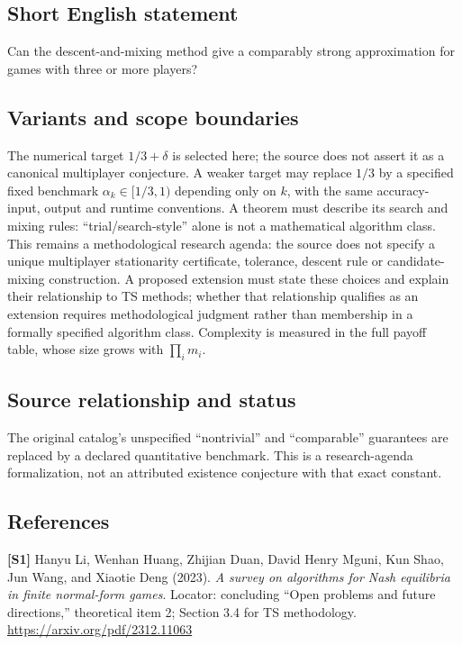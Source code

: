 \documentclass[11pt,a4paper]{article}
\begin{document}
\subsection*{Short English statement}
Can the descent-and-mixing method give a comparably strong approximation for games with three or more players?
\subsection*{Variants and scope boundaries}
The numerical target $1/3+\delta$ is selected here; the source does not assert it as a canonical multiplayer conjecture. A weaker target may replace $1/3$ by a specified fixed benchmark $\alpha_k\in[1/3,1)$ depending only on $k$, with the same accuracy-input, output and runtime conventions. A theorem must describe its search and mixing rules: ``trial/search-style'' alone is not a mathematical algorithm class. This remains a methodological research agenda: the source does not specify a unique multiplayer stationarity certificate, tolerance, descent rule or candidate-mixing construction. A proposed extension must state these choices and explain their relationship to TS methods; whether that relationship qualifies as an extension requires methodological judgment rather than membership in a formally specified algorithm class. Complexity is measured in the full payoff table, whose size grows with $\prod_i m_i$.
\subsection*{Source relationship and status}
The original catalog's unspecified ``nontrivial'' and ``comparable'' guarantees are replaced by a declared quantitative benchmark. This is a research-agenda formalization, not an attributed existence conjecture with that exact constant.
\subsection*{References}
\begingroup\footnotesize\raggedright
{\footnotesize\raggedright
\textbf{[S1]} Hanyu Li, Wenhan Huang, Zhijian Duan, David Henry Mguni, Kun Shao, Jun Wang, and Xiaotie Deng (2023). \emph{A survey on algorithms for Nash equilibria in finite normal-form games}. Locator: concluding ``Open problems and future directions,'' theoretical item 2; Section 3.4 for TS methodology. \url{https://arxiv.org/pdf/2312.11063}\par}
\par\endgroup
\end{document}
